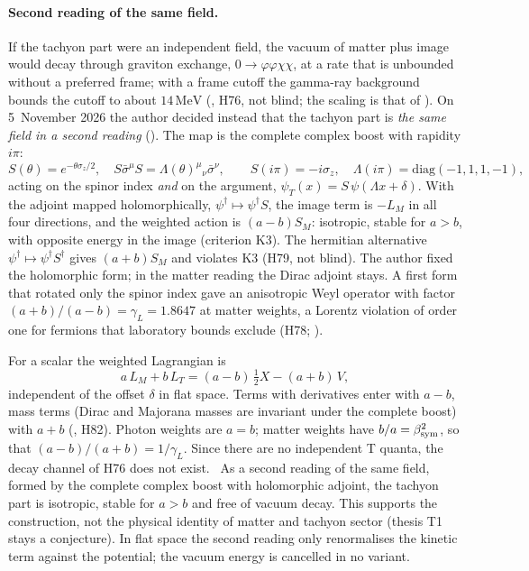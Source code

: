 \paragraph{Second reading of the same field.} If the tachyon part were an independent field, the vacuum of matter plus
image would decay through graviton exchange, $0\to\varphi\varphi\chi\chi$, at a rate that is unbounded without a preferred
frame; with a frame cutoff the gamma-ray background bounds the cutoff to about $14\,\mathrm{MeV}$ (, H76, not
blind; the scaling is that of \cite{D:Cline}). On 5~November 2026 the author decided instead that the tachyon part is
\emph{the same field in a second reading} (). The map is the complete complex boost with rapidity $i\pi$:
\begin{equation}
S(\theta)=e^{-\theta\sigma_z/2},\quad S\bar\sigma^\mu S=\Lambda(\theta)^\mu{}_\nu\bar\sigma^\nu,\qquad
S(i\pi)=-i\sigma_z,\quad \Lambda(i\pi)=\mathrm{diag}(-1,1,1,-1),
\label{eq:act-boost}
\end{equation}
acting on the spinor index \emph{and} on the argument, $\psi_T(x)=S\,\psi(\Lambda x+\delta)$. With the adjoint mapped
holomorphically, $\psi^\dagger\mapsto\psi^\dagger S$, the image term is $-L_M$ in all four directions, and the weighted action
is $(a-b)S_M$: isotropic, stable for $a>b$, with opposite energy in the image (criterion K3). The hermitian alternative
$\psi^\dagger\mapsto\psi^\dagger S^\dagger$ gives $(a+b)S_M$ and violates K3 (H79, not blind). The author fixed the holomorphic
form; in the matter reading the Dirac adjoint stays. A first form that rotated only the spinor index gave an anisotropic
Weyl operator with factor $(a+b)/(a-b)=\gamma_L=1.8647$ at matter weights, a Lorentz violation of order one for fermions
that laboratory bounds exclude (H78; \cite{Altschul2010}).

For a scalar the weighted Lagrangian is
\begin{equation}
a\,L_M+b\,L_T=(a-b)\,\tfrac12X-(a+b)\,V ,
\label{eq:act-weights}
\end{equation}
independent of the offset $\delta$ in flat space. Terms with derivatives enter with $a-b$, mass terms (Dirac and
Majorana masses are invariant under the complete boost) with $a+b$ (, H82). Photon weights are $a=b$; matter
weights have $b/a=\beta_{\mathrm{sym}}^2$, so that $(a-b)/(a+b)=1/\gamma_L$. Since there are no independent T quanta, the decay channel
of H76 does not exist. \Conditional\ As a second reading of the same field, formed by the complete complex boost with
holomorphic adjoint, the tachyon part is isotropic, stable for $a>b$ and free of vacuum decay. This supports the
construction, not the physical identity of matter and tachyon sector (thesis T1 stays a conjecture). In flat space the
second reading only renormalises the kinetic term against the potential; the vacuum energy is cancelled in no variant.

